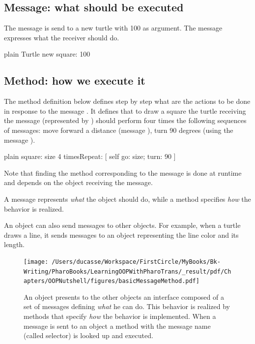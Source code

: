 \documentclass[10pt,twoside,english]{_support/latex/sbabook/sbabook}
\begin{document}
\subsection{Message: what should be executed}
The message  is send to a new turtle with 100 as argument. The message expresses what the receiver should do. 

\begin{displaycode}{plain}
Turtle new square: 100
\end{displaycode}
\subsection{Method: how we execute it}
The method definition  below defines step by step what are the actions to be done in response to the message . It defines that to draw a square the turtle receiving the message  (represented by ) should perform four times the following sequences of messages: move forward a distance (message ), turn 90 degrees (using the message ).

\begin{displaycode}{plain}
square: size
	4 timesRepeat: [ self go: size; turn: 90 ]
\end{displaycode}

Note that finding the method corresponding to the message is done at runtime and depends on the object receiving the message.

\begin{coffee}
A message represents \textit{what} the object should do, while a method specifies \textit{how} the behavior is realized. 
\end{coffee}

An object can also send messages to other objects. For example, when a turtle draws a line, it sends messages to an object representing the line color and its length.


\begin{figure}

\begin{center}
\texttt{[image: /Users/ducasse/Workspace/FirstCircle/MyBooks/Bk-Writing/PharoBooks/LearningOOPWithPharoTrans/\_result/pdf/Chapters/OOPNutshell/figures/basicMessageMethod.pdf]}\caption{An object presents to the other objects an interface composed of a set of messages defining \textit{what} he can do. This behavior is realized by methods that specify \textit{how} the behavior is implemented. When a message is sent to an object a method with the message name (called selector) is looked up and executed. \label{basicMessageMethod}}\end{center}
\end{figure}
\end{document}
